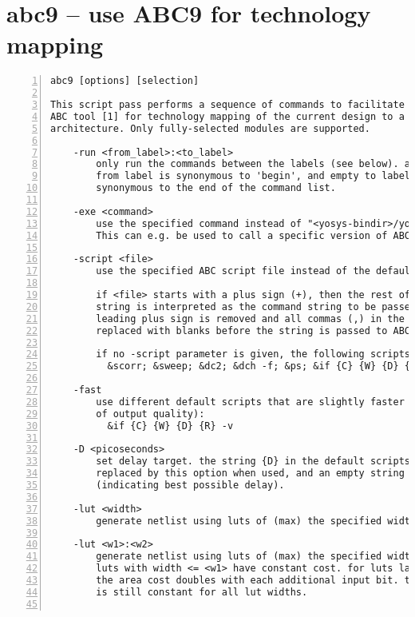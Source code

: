 \section{abc9 -- use ABC9 for technology mapping}
\label{cmd:abc9}
\begin{lstlisting}[numbers=left,frame=single]
    abc9 [options] [selection]

This script pass performs a sequence of commands to facilitate the use of the
ABC tool [1] for technology mapping of the current design to a target FPGA
architecture. Only fully-selected modules are supported.

    -run <from_label>:<to_label>
        only run the commands between the labels (see below). an empty
        from label is synonymous to 'begin', and empty to label is
        synonymous to the end of the command list.

    -exe <command>
        use the specified command instead of "<yosys-bindir>/yosys-abc" to execute ABC.
        This can e.g. be used to call a specific version of ABC or a wrapper.

    -script <file>
        use the specified ABC script file instead of the default script.

        if <file> starts with a plus sign (+), then the rest of the filename
        string is interpreted as the command string to be passed to ABC. The
        leading plus sign is removed and all commas (,) in the string are
        replaced with blanks before the string is passed to ABC.

        if no -script parameter is given, the following scripts are used:
          &scorr; &sweep; &dc2; &dch -f; &ps; &if {C} {W} {D} {R} -v; &mfs

    -fast
        use different default scripts that are slightly faster (at the cost
        of output quality):
          &if {C} {W} {D} {R} -v

    -D <picoseconds>
        set delay target. the string {D} in the default scripts above is
        replaced by this option when used, and an empty string otherwise
        (indicating best possible delay).

    -lut <width>
        generate netlist using luts of (max) the specified width.

    -lut <w1>:<w2>
        generate netlist using luts of (max) the specified width <w2>. All
        luts with width <= <w1> have constant cost. for luts larger than <w1>
        the area cost doubles with each additional input bit. the delay cost
        is still constant for all lut widths.


\end{lstlisting}
